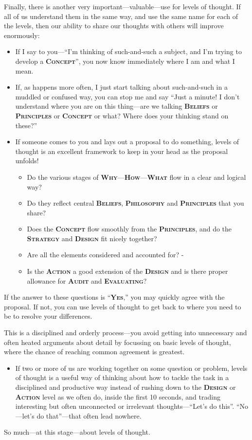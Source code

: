 \documentclass[a5paper]{article}
\begin{document}
Finally, there is another very important---valuable---use for levels of thought.
If all of us understand them in the same way, and use the same name for each of the levels, then our ability to share our thoughts with others will improve enormously:
\begin{itemize}
  \item If I say to you---``I'm thinking of such-and-such a subject, and I'm trying to develop a \textbf{\scshape Concept}'', you now know immediately where I am and what I mean.
  \item If, as happens more often, I just start talking about such-and-such in a muddled or confused way, you can stop me and say ``Just a minute! I don't understand where you are on this thing---are we talking \textbf{\scshape Beliefs} or \textbf{\scshape Principles} or \textbf{\scshape Concept} or what?
    Where does your thinking stand on these?''
  \item If someone comes to you and lays out a proposal to do something, levels of thought is an excellent framework to keep in your head as the proposal unfolds!
    \begin{itemize}
      \item Do the various stages of \textbf{\scshape Why}---\textbf{\scshape How}---\textbf{\scshape What} flow in a clear and logical way?
      \item Do they reflect central \textbf{\scshape Beliefs}, \textbf{\scshape Philosophy} and \textbf{\scshape Principles} that you share?
      \item Does the \textbf{\scshape Concept} flow smoothly from the \textbf{\scshape Principles}, and do the \textbf{\scshape Strategy} and \textbf{\scshape Design} fit nicely together?
      \item Are all the elements considered and accounted for? -
      \item Is the \textbf{\scshape Action} a good extension of the \textbf{\scshape Design} and is there proper allowance for \textbf{\scshape Audit} and \textbf{\scshape Evaluating}?
    \end{itemize}
\end{itemize}
If the answer to these questions is ``\textbf{\scshape Yes},'' you may quickly agree with the proposal.
If not, you can use levels of thought to get back to where you need to be to resolve your differences.

This is a disciplined and orderly process---you avoid getting into unnecessary and often heated arguments about detail by focussing on basic levels of thought, where the chance of reaching common agreement is greatest.
\begin{itemize}
  \item If two or more of us are working together on some question or problem, levels of thought is a useful way of thinking about how to tackle the task in a disciplined and productive way instead of rushing down to the \textbf{\scshape Design} or \textbf{\scshape Action} level as we often do, inside the first 10 seconds, and trading interesting but often unconnected or irrelevant thoughts---``Let's do this''. ``No---let's do that''---that often lead nowhere.
\end{itemize}
So much---at this stage---about levels of thought.
\end{document}

